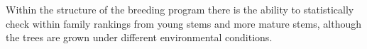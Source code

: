 Within the structure of the breeding program there is the ability to
statistically check within family rankings from young stems and more mature
stems, although the trees are grown under different environmental conditions.